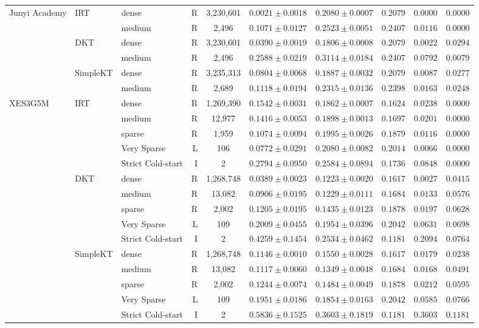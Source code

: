 \begin{table}[htbp]
{\begin{tabular}{lllrcccccc}
Junyi Academy & IRT & dense & R & 3,230,601 & $0.0021 \pm 0.0018$ & $0.2080 \pm 0.0007$ & $0.2079$ & $0.0000$ & $0.0000$ \\
 &  & medium & R & 2,496 & $0.1071 \pm 0.0127$ & $0.2523 \pm 0.0051$ & $0.2407$ & $0.0116$ & $0.0000$ \\
 & DKT & dense & R & 3,230,601 & $0.0390 \pm 0.0019$ & $0.1806 \pm 0.0008$ & $0.2079$ & $0.0022$ & $0.0294$ \\
 &  & medium & R & 2,496 & $0.2588 \pm 0.0219$ & $0.3114 \pm 0.0184$ & $0.2407$ & $0.0792$ & $0.0079$ \\
 & SimpleKT & dense & R & 3,235,313 & $0.0804 \pm 0.0068$ & $0.1887 \pm 0.0032$ & $0.2079$ & $0.0087$ & $0.0277$ \\
 &  & medium & R & 2,689 & $0.1118 \pm 0.0194$ & $0.2315 \pm 0.0136$ & $0.2398$ & $0.0163$ & $0.0248$ \\
\midrule
XES3G5M & IRT & dense & R & 1,269,390 & $0.1542 \pm 0.0031$ & $0.1862 \pm 0.0007$ & $0.1624$ & $0.0238$ & $0.0000$ \\
 &  & medium & R & 12,977 & $0.1416 \pm 0.0053$ & $0.1898 \pm 0.0013$ & $0.1697$ & $0.0201$ & $0.0000$ \\
 &  & sparse & R & 1,959 & $0.1074 \pm 0.0094$ & $0.1995 \pm 0.0026$ & $0.1879$ & $0.0116$ & $0.0000$ \\
 &  & Very Sparse & L & 106 & $0.0772 \pm 0.0291$ & $0.2080 \pm 0.0082$ & $0.2014$ & $0.0066$ & $0.0000$ \\
 &  & Strict Cold-start & I & 2 & $0.2794 \pm 0.0950$ & $0.2584 \pm 0.0894$ & $0.1736$ & $0.0848$ & $0.0000$ \\
 & DKT & dense & R & 1,268,748 & $0.0389 \pm 0.0023$ & $0.1223 \pm 0.0020$ & $0.1617$ & $0.0027$ & $0.0415$ \\
 &  & medium & R & 13,082 & $0.0906 \pm 0.0195$ & $0.1229 \pm 0.0111$ & $0.1684$ & $0.0133$ & $0.0576$ \\
 &  & sparse & R & 2,002 & $0.1205 \pm 0.0195$ & $0.1435 \pm 0.0123$ & $0.1878$ & $0.0197$ & $0.0628$ \\
 &  & Very Sparse & L & 109 & $0.2009 \pm 0.0455$ & $0.1954 \pm 0.0396$ & $0.2042$ & $0.0631$ & $0.0698$ \\
 &  & Strict Cold-start & I & 2 & $0.4259 \pm 0.1454$ & $0.2534 \pm 0.0462$ & $0.1181$ & $0.2094$ & $0.0764$ \\
 & SimpleKT & dense & R & 1,268,748 & $0.1146 \pm 0.0010$ & $0.1550 \pm 0.0028$ & $0.1617$ & $0.0179$ & $0.0238$ \\
 &  & medium & R & 13,082 & $0.1117 \pm 0.0060$ & $0.1349 \pm 0.0048$ & $0.1684$ & $0.0168$ & $0.0491$ \\
 &  & sparse & R & 2,002 & $0.1244 \pm 0.0074$ & $0.1484 \pm 0.0049$ & $0.1878$ & $0.0212$ & $0.0595$ \\
 &  & Very Sparse & L & 109 & $0.1951 \pm 0.0186$ & $0.1854 \pm 0.0163$ & $0.2042$ & $0.0585$ & $0.0766$ \\
 &  & Strict Cold-start & I & 2 & $0.5836 \pm 0.1525$ & $0.3603 \pm 0.1819$ & $0.1181$ & $0.3603$ & $0.1181$ \\
\bottomrule


\end{tabular}}
\end{table}
